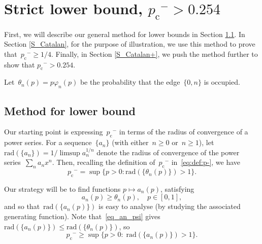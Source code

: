 \documentclass[pdflatex,sn-mathphys-num]{sn-jnl}%
\newcommand{\1}{{\ensuremath{\mathbf{1}}} }
\newcommand{\pc}{\ensuremath{p_{\mathrm{c}} }}
\theoremstyle{thmstyleone}%
\theoremstyle{thmstyletwo}%
\theoremstyle{thmstylethree}%
\begin{document}
\section{Strict lower bound,  \texorpdfstring{$\pc^- > 0.254$}{pc->0.254}}
\label{sec:lower}

First, we will describe our 
general method for lower bounds in Section \ref{ss_method_lower}. In Section \ref{S_Catalan}, for the purpose of illustration, we 
use this method to prove that~$\pc^- \ge 1/4$. Finally, in Section \ref{S_Catalan+}, we push the method further to show that $\pc^- > 0.254$. 

Let~$\theta_n(p) = p \varphi_n(p)$ be the probability that the edge~$\{0,n\}$ is occupied.












\subsection{Method for lower bound}
\label{ss_method_lower}
Our starting point is expressing~$\pc^-$ in terms of the radius of convergence of a power series. For a sequence~$\{a_n\}$ (with either~$n \ge 0$ or~$n \ge 1$), let~$\mathrm{rad}(\{a_n\}) = 1/\limsup a_n^{1/n}$ denote the radius of convergence of the power series~$\sum_{n} a_nx^n$. Then, recalling the definition of~$\pc^-$ in~\eqref{eq:def:p-}, we have
\begin{equation}\label{eq_pc-radius}
\pc^- = \sup\{p > 0: \mathrm{rad}(\{\theta_n(p)\}) > 1\}.
\end{equation}

Our strategy will be to find 
functions $p \mapsto a_n(p)$, satisfying
\begin{equation}
	\label{eq_an_psi}
	a_n(p) \ge \theta_n(p),\quad p \in [0,1],
\end{equation}
and so that~$\mathrm{rad}(\{a_n(p)\})$ is easy to analyse (by studying the associated generating function). Note that~\eqref{eq_an_psi} gives~$\mathrm{rad}(\{a_n(p)\}) \le \mathrm{rad}(\{\theta_n(p)\})$, so
\begin{equation}
	\label{eq_radius_an}
	\pc^- \ge \sup\{p > 0:\; \mathrm{rad}(\{a_n(p)\}) > 1\}.
\end{equation}
\end{document}
